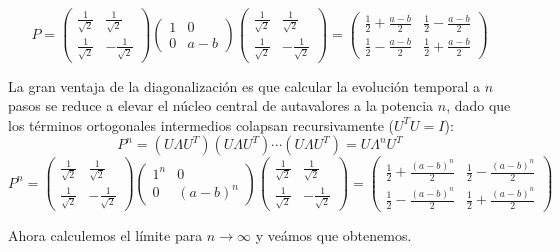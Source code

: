 \begin{ejemplo}
\begin{description}
\[        P = \begin{pmatrix} \frac{1}{\sqrt{2}} & \frac{1}{\sqrt{2}} \\[0.15cm] \frac{1}{\sqrt{2}} & -\frac{1}{\sqrt{2}} \end{pmatrix} \begin{pmatrix} 1 & 0 \\ 0 & a-b \end{pmatrix} \begin{pmatrix} \frac{1}{\sqrt{2}} & \frac{1}{\sqrt{2}} \\[0.15cm] \frac{1}{\sqrt{2}} & -\frac{1}{\sqrt{2}} \end{pmatrix} = \begin{pmatrix} \frac{1}{2} + \frac{a-b}{2} & \frac{1}{2} - \frac{a-b}{2} \\[0.15cm] \frac{1}{2} - \frac{a-b}{2} & \frac{1}{2} + \frac{a-b}{2} \end{pmatrix}
        \]

        \item[\tbf{Evolución Temporal.}]  La gran ventaja de la diagonalización es que calcular la evolución temporal a $n$ pasos se reduce a elevar el núcleo central de autavalores a la potencia $n$, dado que los términos ortogonales intermedios colapsan recursivamente ($U^T U = I$):
        \[ 
        P^n = (U \Lambda U^T)(U \Lambda U^T) \cdots (U \Lambda U^T) = U \Lambda^n U^T 
        \]
        \[ 
        P^n = \begin{pmatrix} \frac{1}{\sqrt{2}} & \frac{1}{\sqrt{2}} \\[0.15cm] \frac{1}{\sqrt{2}} & -\frac{1}{\sqrt{2}} \end{pmatrix} \begin{pmatrix} 1^n & 0 \\ 0 & (a-b)^n \end{pmatrix} \begin{pmatrix} \frac{1}{\sqrt{2}} & \frac{1}{\sqrt{2}} \\[0.15cm] \frac{1}{\sqrt{2}} & -\frac{1}{\sqrt{2}} \end{pmatrix} = \begin{pmatrix} \frac{1}{2} + \frac{(a-b)^n}{2} & \frac{1}{2} - \frac{(a-b)^n}{2} \\[0.2cm] \frac{1}{2} - \frac{(a-b)^n}{2} & \frac{1}{2} + \frac{(a-b)^n}{2} \end{pmatrix}
        \]
    \end{description}
    Ahora calculemos el límite para $n\to \infty$ y veámos que obtenemos. \\


\end{ejemplo}
